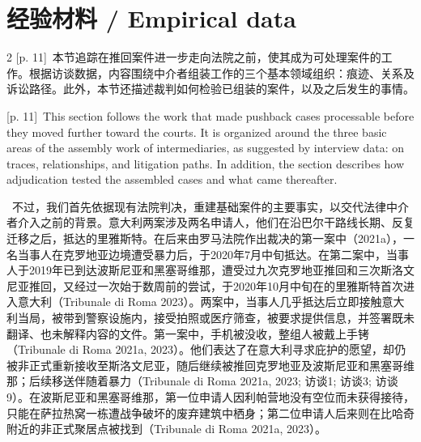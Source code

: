 \documentclass[10pt,a4paper]{article}
\begin{document}
\section*{经验材料 / Empirical data}
\begin{paracol}{2}
{\scriptsize\color{gray} [p. 11]}\ 本节追踪在推回案件进一步走向法院之前，使其成为可处理案件的工作。根据访谈数据，内容围绕中介者组装工作的三个基本领域组织：痕迹、关系及诉讼路径。此外，本节还描述裁判如何检验已组装的案件，以及之后发生的事情。\par
\switchcolumn
{\scriptsize\color{gray} [p. 11]}\ This section follows the work that made pushback cases processable before they moved further toward the courts. It is organized around the three basic areas of the assembly work of intermediaries, as suggested by interview data: on traces, relationships, and litigation paths. In addition, the section describes how adjudication tested the assembled cases and what came thereafter.\par
\switchcolumn*
{\scriptsize\color{gray} [p. 11]}\ 不过，我们首先依据现有法院判决，重建基础案件的主要事实，以交代法律中介者介入之前的背景。意大利两案涉及两名申请人，他们在沿巴尔干路线长期、反复迁移之后，抵达的里雅斯特。在后来由罗马法院作出裁决的第一案中（2021a），一名当事人在克罗地亚边境遭受暴力后，于2020年7月中旬抵达。在第二案中，当事人于2019年已到达波斯尼亚和黑塞哥维那，遭受过九次克罗地亚推回和三次斯洛文尼亚推回，又经过一次始于数周前的尝试，于2020年10月中旬在的里雅斯特首次进入意大利（Tribunale di Roma 2023）。两案中，当事人几乎抵达后立即接触意大利当局，被带到警察设施内，接受拍照或医疗筛查，被要求提供信息，并签署既未翻译、也未解释内容的文件。第一案中，手机被没收，整组人被戴上手铐（Tribunale di Roma 2021a, 2023）。他们表达了在意大利寻求庇护的愿望，却仍被非正式重新接收至斯洛文尼亚，随后继续被推回克罗地亚及波斯尼亚和黑塞哥维那；后续移送伴随着暴力（Tribunale di Roma 2021a, 2023; 访谈1; 访谈3; 访谈9）。在波斯尼亚和黑塞哥维那，第一位申请人因利帕营地没有空位而未获得接待，只能在萨拉热窝一栋遭战争破坏的废弃建筑中栖身；第二位申请人后来则在比哈奇附近的非正式聚居点被找到（Tribunale di Roma 2021a, 2023）。\par
\switchcolumn

\end{paracol}
\end{document}
